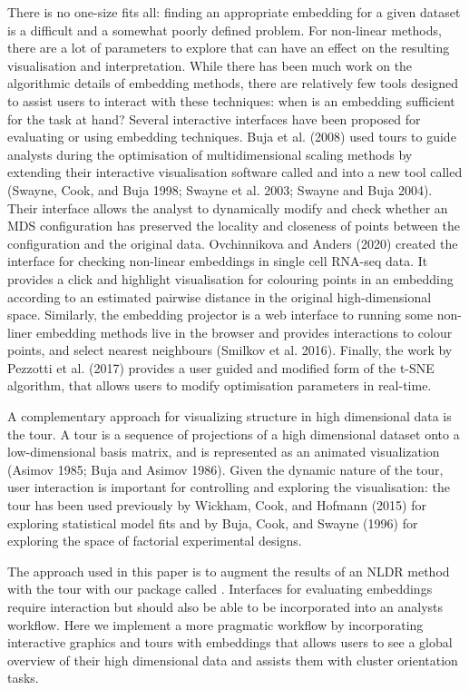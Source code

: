 \documentclass[article,notitle]{jdssv}
\begin{document}
There is no one-size fits all: finding an appropriate embedding for a given
dataset is a difficult and a somewhat poorly defined problem. For non-linear
methods, there are a lot of parameters to explore that can have an effect on
the resulting visualisation and interpretation.
While there has been much work on the algorithmic details of
embedding methods, there are relatively few tools designed to assist users
to interact with these techniques: when is an embedding sufficient for the
task at hand? Several
interactive interfaces have been proposed for evaluating or using embedding
techniques. Buja et al. (2008) used tours to guide analysts during the optimisation
of multidimensional scaling methods by extending their interactive visualisation
software called  and  into a new tool called 
(Swayne, Cook, and Buja 1998; Swayne et al. 2003; Swayne and Buja 2004).
Their interface allows the analyst to dynamically modify and check whether
an MDS configuration has preserved the locality and closeness
of points between the configuration and the original data.
Ovchinnikova and Anders (2020) created the  interface for checking
non-linear embeddings in single cell RNA-seq data. It provides a click and
highlight visualisation for colouring points in an embedding according to an
estimated pairwise distance in the original high-dimensional space.
Similarly, the  embedding projector is a web interface to
running some non-liner embedding methods live in the browser and
provides interactions to colour points, and select nearest neighbours
(Smilkov et al. 2016). Finally, the work by Pezzotti et al. (2017) provides a user
guided and modified form of the t-SNE algorithm, that allows users to modify
optimisation parameters in real-time.

A complementary approach for visualizing structure in high dimensional data is
the tour. A tour is a sequence of projections of a high dimensional dataset
onto a low-dimensional basis matrix, and is represented as an
animated visualization (Asimov 1985; Buja and Asimov 1986). Given the dynamic
nature of the tour, user interaction is important for controlling and
exploring the visualisation: the tour has been used previously by
Wickham, Cook, and Hofmann (2015) for exploring statistical model fits and by Buja, Cook, and Swayne (1996) for
exploring the space of factorial experimental designs.

The approach used in this paper is to augment the results of an NLDR method with the tour with our  package called . Interfaces for evaluating
embeddings require interaction but should also be able to be incorporated into
an analysts workflow. Here we implement a more pragmatic workflow by
incorporating interactive graphics and tours with embeddings that allows users
to see a global overview of their high dimensional data and assists them with cluster orientation tasks.
\end{document}
